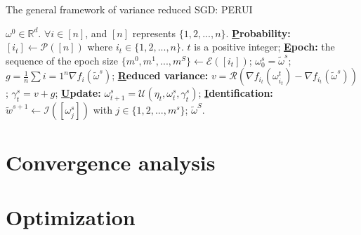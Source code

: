 \documentclass[letterpaper]{article}
\begin{document}
\begin{algorithm}[t]
    \caption{The general framework of variance reduced SGD: PERUI}
    \label{algorithm_combine}
    \begin{algorithmic}[1]
        \Require $\omega^0\in \mathbb{R}^d$. $\forall i\in[n]$, and $[n]$ represents $\{1,2, ..., n\}$.
        \State \textbf{\uline{P}robability:} $[i_t]\leftarrow \mathcal{P}([n])$ where $i_t \in \{1,2, ..., n\}$. $t$ is a positive integer;
        \State \textbf{\uline{E}poch:} the sequence of the epoch size $\{m^0, m^1, ..., m^S\}\leftarrow \mathcal{E}([i_t])$;
            \State $\omega_0^s=\tilde{\omega}^s$;
            \State $g=\frac{1}{n}\sum\limits{i=1}^n\nabla f_i(\tilde{\omega}^s)$;
                \State \textbf{\uline{R}educed variance:} $v=\mathcal{R}(\nabla f_{i_t}(\omega_{i_t}^t)-\nabla f_{i_t}(\tilde{\omega}^s))$;
                \State $\gamma_t^s=v+g$;
                \State \textbf{\uline{U}pdate:} $\omega_{t+1}^s=\mathcal{U}(\eta_t, \omega_t^s, \gamma_t^s)$;
            \EndFor
            \textbf{\uline{I}dentification:} $\tilde{w}^{s+1}\leftarrow\mathcal{I}([\omega_j^s])$ with $j\in\{1,2, ..., m^s\}$;
        \EndFor
        \Return $\tilde{\omega}^S$.
    \end{algorithmic}
\end{algorithm}









\section{Convergence analysis}
\label{sect_convergence_analysis}








\section{Optimization}
\label{sect_optimization}
\end{document}

